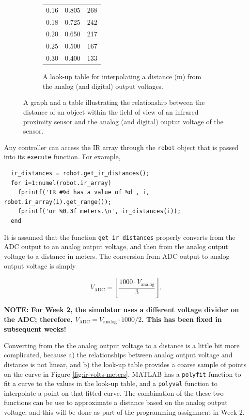 \documentclass[10pt]{article}
\begin{document}
\begin{figure}[t]
\begin{subfigure}{0.45\textwidth}
\begin{center}
\begin{tabular}{|p{}|p{}|p{}|}
       0.16 & 0.805 & 268 \\
       0.18 & 0.725 & 242 \\
       0.20 & 0.650 & 217 \\
       0.25 & 0.500 & 167 \\
       0.30 & 0.400 & 133 \\
       \hline
    \end{tabular}
  \end{center}
    \caption{A look-up table for interpolating a distance (m) from the analog (and digital) output voltages.}
    \label{fig:ir-adc}
  \end{subfigure}
  \caption{A graph and a table illustrating the relationship between the distance of an object within the field of view of an infrared proximity sensor and the analog (and digital) ouptut voltage of the sensor.}
\end{figure}

Any controller can access the IR array through the \texttt{robot} object that is passed into its \texttt{execute} function. For example,
\begin{verbatim}
  ir_distances = robot.get_ir_distances();
  for i=1:numel(robot.ir_array)
    fprintf('IR #%d has a value of %d', i, robot.ir_array(i).get_range());
    fprintf('or %0.3f meters.\n', ir_distances(i));
  end
\end{verbatim}

It is assumed that the function \texttt{get\_ir\_distances} properly converts from the ADC output to an analog output voltage, and then from the analog output voltage to a distance in meters. The conversion from ADC output to analog output voltage is simply

\begin{equation*}
  V_{\text{ADC}} = \left\lfloor\frac{1000\cdot V_{\text{analog}}}{3}\right\rfloor.
\end{equation*}

\textbf{NOTE: For Week 2, the simulator uses a different voltage divider on the ADC; therefore, $V_{\text{ADC}}= V_{\text{analog}}\cdot 1000/2$. This has been fixed in subsequent weeks!}

Converting from the the analog output voltage to a distance is a little bit more complicated, because a) the relationships between analog output voltage and distance is not linear, and b) the look-up table provides a coarse sample of points on the curve in Figure \ref{fig:ir-volts-meters}. MATLAB has a \texttt{polyfit} function to fit a curve to the values in the look-up table, and a \texttt{polyval} function to interpolate a point on that fitted curve. The combination of the these two functions can be use to approximate a distance based on the analog output voltage, and this will be done as part
of the programming assignment in Week 2. 
\end{document}
